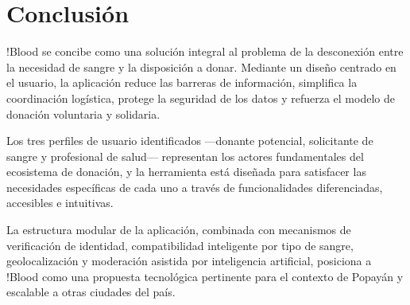 \section*{Conclusión}

!Blood se concibe como una solución integral al problema de la desconexión entre la necesidad de sangre y la disposición a donar. Mediante un diseño centrado en el usuario, la aplicación reduce las barreras de información, simplifica la coordinación logística, protege la seguridad de los datos y refuerza el modelo de donación voluntaria y solidaria.

Los tres perfiles de usuario identificados ---donante potencial, solicitante de sangre y profesional de salud--- representan los actores fundamentales del ecosistema de donación, y la herramienta está diseñada para satisfacer las necesidades específicas de cada uno a través de funcionalidades diferenciadas, accesibles e intuitivas.

La estructura modular de la aplicación, combinada con mecanismos de verificación de identidad, compatibilidad inteligente por tipo de sangre, geolocalización y moderación asistida por inteligencia artificial, posiciona a !Blood como una propuesta tecnológica pertinente para el contexto de Popayán y escalable a otras ciudades del país.
